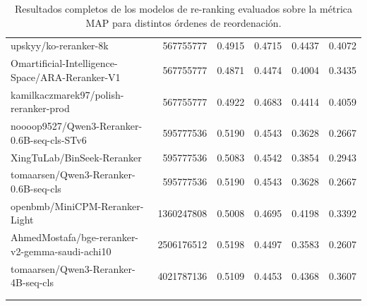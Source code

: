 {\begin{xltabular}{\textwidth}{X rrrrr}
      upskyy/ko-reranker-8k                                                  & 567755777     & 0.4915        & 0.4715        & 0.4437        & 0.4072         \\
      Omartificial-Intelligence-Space/ARA-Reranker-V1                        & 567755777     & 0.4871        & 0.4474        & 0.4004        & 0.3435         \\
      kamilkaczmarek97/polish-reranker-prod                                  & 567755777     & 0.4922        & 0.4683        & 0.4414        & 0.4059         \\
      noooop9527/Qwen3-Reranker-0.6B-seq-cls-STv6                            & 595777536     & 0.5190        & 0.4543        & 0.3628        & 0.2667         \\
      XingTuLab/BinSeek-Reranker                                             & 595777536     & 0.5083        & 0.4542        & 0.3854        & 0.2943         \\
      tomaarsen/Qwen3-Reranker-0.6B-seq-cls                                  & 595777536     & 0.5190        & 0.4543        & 0.3628        & 0.2667         \\
      openbmb/MiniCPM-Reranker-Light                                         & 1360247808    & 0.5008        & 0.4695        & 0.4198        & 0.3392         \\
      AhmedMostafa/bge-reranker-v2-gemma-saudi-achi10                        & 2506176512    & 0.5198        & 0.4497        & 0.3583        & 0.2607         \\
      tomaarsen/Qwen3-Reranker-4B-seq-cls                                    & 4021787136    & 0.5109        & 0.4453        & 0.4368        & 0.3607         \\
      \hline
      \label{tab:cross_encoder_results} \\
      \caption{Resultados completos de los modelos de re-ranking evaluados sobre la métrica \gls{MAP} para distintos órdenes de reordenación.}
  \end{xltabular}
 }



